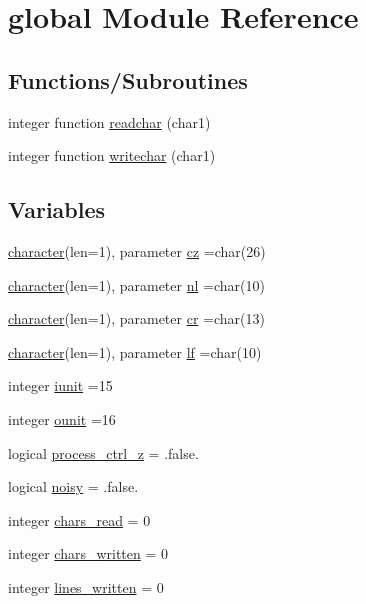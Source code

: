 \hypertarget{namespaceglobal}{}\section{global Module Reference}
\label{namespaceglobal}
\subsection*{Functions/\+Subroutines}
\begin{DoxyCompactItemize}
\item 
integer function \hyperlink{namespaceglobal_ac0b651e598e238c7eacf10df65cd92b2}{readchar} (char1)
\item 
integer function \hyperlink{namespaceglobal_aa4c95f5c7250975b756bcd2131c3b88c}{writechar} (char1)
\end{DoxyCompactItemize}
\subsection*{Variables}
\begin{DoxyCompactItemize}
\item 
\hyperlink{option__stopwatch_83_8txt_abd4b21fbbd175834027b5224bfe97e66}{character}(len=1), parameter \hyperlink{namespaceglobal_ae55226f82ca7ee1f12eeb19f4619f98c}{cz} =char(26)
\item 
\hyperlink{option__stopwatch_83_8txt_abd4b21fbbd175834027b5224bfe97e66}{character}(len=1), parameter \hyperlink{namespaceglobal_a972f6c4dda60a65f2529b3fa30f61ad5}{nl} =char(10)
\item 
\hyperlink{option__stopwatch_83_8txt_abd4b21fbbd175834027b5224bfe97e66}{character}(len=1), parameter \hyperlink{namespaceglobal_a66654a3eb0e9c862da1f7ca5388b2e83}{cr} =char(13)
\item 
\hyperlink{option__stopwatch_83_8txt_abd4b21fbbd175834027b5224bfe97e66}{character}(len=1), parameter \hyperlink{namespaceglobal_a65a09148e3924472bdd8a5735476c7ed}{lf} =char(10)
\item 
integer \hyperlink{namespaceglobal_ad88d280367759e82acb4de429dce1caa}{iunit} =15
\item 
integer \hyperlink{namespaceglobal_a243230c67d07fa783b97362c247e777c}{ounit} =16
\item 
logical \hyperlink{namespaceglobal_ab06e1a0896cfbbc3a6516eedaba862e0}{process\+\_\+ctrl\+\_\+z} = .false.
\item 
logical \hyperlink{namespaceglobal_af2859727a2cdfcff37dacc9cadc1c046}{noisy} = .false.
\item 
integer \hyperlink{namespaceglobal_a2d038312d6b015cabfbb5716cb61baac}{chars\+\_\+read} = 0
\item 
integer \hyperlink{namespaceglobal_a22f0db93abbbbd8c37f50b829daa00ad}{chars\+\_\+written} = 0
\item 
integer \hyperlink{namespaceglobal_a85ce1360a8a9498bab52f97d527bee12}{lines\+\_\+written} = 0
\end{DoxyCompactItemize}


